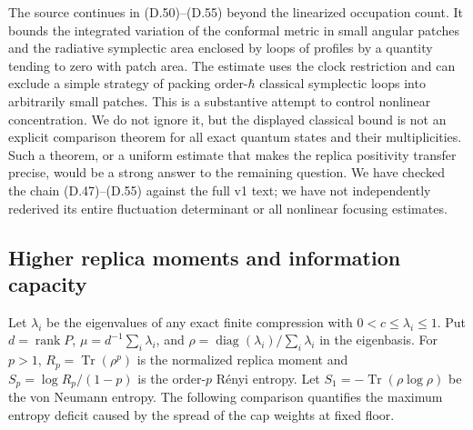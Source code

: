 \documentclass[11pt]{article}
\newcommand{\Tr}{\operatorname{Tr}}
\DeclareMathOperator{\rank}{rank}
\begin{document}
The source continues in (D.50)--(D.55) beyond the linearized occupation count. It bounds the integrated variation of the conformal metric in small angular patches and the radiative symplectic area enclosed by loops of profiles by a quantity tending to zero with patch area. The estimate uses the clock restriction and can exclude a simple strategy of packing order-$\hbar$ classical symplectic loops into arbitrarily small patches. This is a substantive attempt to control nonlinear concentration. We do not ignore it, but the displayed classical bound is not an explicit comparison theorem for all exact quantum states and their multiplicities. Such a theorem, or a uniform estimate that makes the replica positivity transfer precise, would be a strong answer to the remaining question. We have checked the chain (D.47)--(D.55) against the full v1 text; we have not independently rederived its entire fluctuation determinant or all nonlinear focusing estimates.

\subsection{Higher replica moments and information capacity}
Let $\lambda_i$ be the eigenvalues of any exact finite compression with $0<c\le\lambda_i\le1$. Put $d=\rank P$, $\mu=d^{-1}\sum_i\lambda_i$, and $\rho=\operatorname{diag}(\lambda_i)/\sum_i\lambda_i$ in the eigenbasis. For $p>1$, $R_p=\Tr(\rho^p)$ is the normalized replica moment and $S_p=\log R_p/(1-p)$ is the order-$p$ R\'enyi entropy. Let $S_1=-\Tr(\rho\log\rho)$ be the von Neumann entropy. The following comparison quantifies the maximum entropy deficit caused by the spread of the cap weights at fixed floor.
\end{document}
